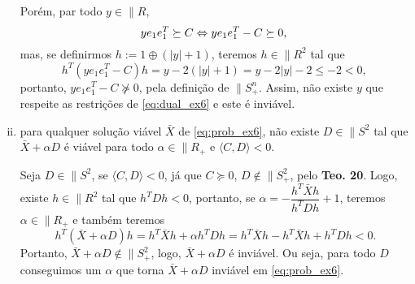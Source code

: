 \begin{homeworkProblem}
\begin{enumerate}[(i)]
\begin{homeworkProblemAnswer}
Porém, par todo $y \in \|{R}$,
$$
    ye_1e_1^T \succeq C \Leftrightarrow 
    ye_1e_1^T - C \succeq 0 \text{, }
$$
mas, se definirmos $h := 1 \oplus (|y| + 1)$, teremos $h \in \|{R}^2$ tal que
$$
    h^T(ye_1e_1^T - C)h = 
    y - 2(|y|+1) = 
    y - 2|y| - 2 \leq
    -2 <
    0 \text{, }
$$
portanto, $ye_1e_1^T - C \not\succeq 0$, pela definição de $\|{S}_+^n$. Assim, não existe $y$ que respeite as restrições de \eqref{eq:dual_ex6} e este é inviável.
\end{homeworkProblemAnswer}

\item para qualquer solução viável $\bar{X}$ de \eqref{eq:prob_ex6}, não existe $D \in \|{S}^2$ tal que $\bar{X} + \alpha D$ é viável para todo $\alpha \in \|{R}_+$ e $\langle C, D \rangle < 0$.

\begin{homeworkProblemAnswer}
Seja $D \in \|{S}^2$, se $\langle C, D \rangle < 0$, já que $C \succeq 0$, $D \notin \|{S}_+^2$, pelo \textbf{Teo. 20}. Logo, existe $h \in \|{R}^2$ tal que $h^TDh < 0$, portanto, se $\alpha = -\dfrac{h^T\bar{X}h}{h^TDh} + 1$, teremos $\alpha \in \|{R}_+$ e também teremos
$$ h^T(\bar{X} + \alpha D)h = h^T\bar{X}h + \alpha h^TDh = h^T\bar{X}h - h^T\bar{X}h + h^TDh < 0. $$
Portanto, $\bar{X} + \alpha D \notin \|{S}_+^2$, logo, $\bar{X} + \alpha D$ é inviável. Ou seja, para todo $D$ conseguimos um $\alpha$ que torna $\bar{X} + \alpha D$ inviável em \eqref{eq:prob_ex6}.
\end{homeworkProblemAnswer}

\end{enumerate}
\end{homeworkProblem}

